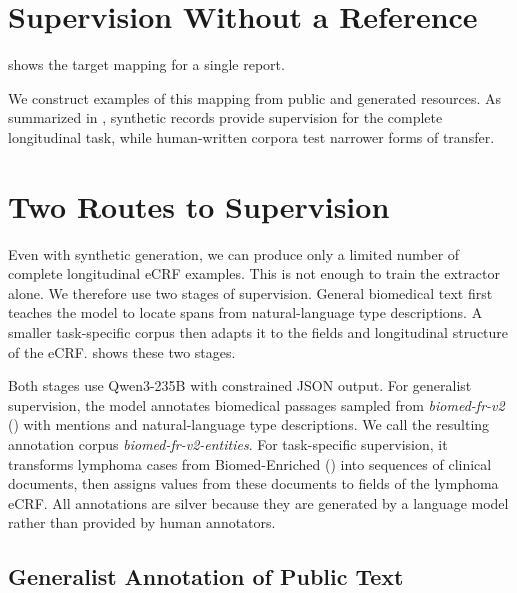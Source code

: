 \section{Supervision Without a Reference}

 shows the target mapping for a single report.



We construct examples of this mapping from public and generated resources. As
summarized in , synthetic records provide supervision for
the complete longitudinal task, while human-written corpora test narrower forms
of transfer.



\section{Two Routes to Supervision}

Even with synthetic generation, we can produce only a limited number of complete
longitudinal eCRF examples. This is not enough to train the extractor alone. We
therefore use two stages of supervision. General biomedical text first teaches
the model to locate spans from natural-language type descriptions. A smaller
task-specific corpus then adapts it to the fields and longitudinal structure of
the eCRF.  shows these two stages.

Both stages use Qwen3-235B with constrained JSON output. For generalist
supervision, the model annotates biomedical passages sampled from
\textit{biomed-fr-v2} () with mentions and natural-language type
descriptions. We call the resulting annotation corpus
\textit{biomed-fr-v2-entities}. For task-specific supervision, it transforms
lymphoma cases from Biomed-Enriched () into sequences of clinical documents, then
assigns values from these documents to fields of the lymphoma eCRF. All
annotations are silver because they are generated by a language model rather
than provided by human annotators.




\subsection{Generalist Annotation of Public Text}
\label{sec:gliner-data}

